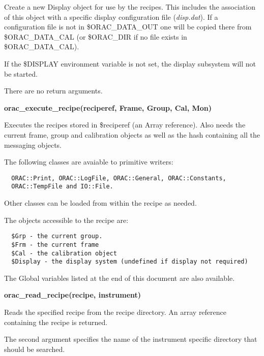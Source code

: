 \begin{description}
\item[\textbf{orac\_setup\_display}] \mbox{}

Create a new Display object for use by the recipes. This includes
the association of this object with a specific display configuration
file (\emph{disp.dat}). If a configuration file is not in \$ORAC\_DATA\_OUT
one will be copied there from \$ORAC\_DATA\_CAL (or \$ORAC\_DIR
if no file exists in \$ORAC\_DATA\_CAL).



If the \$DISPLAY environment variable is not set, the display
subsystem will not be started.



There are no return arguments.

\item \textbf{\textbf{orac\_execute\_recipe}(reciperef, Frame, Group, Cal, Mon)}

Executes the recipes stored in \$reciperef (an Array reference).
Also needs the current frame, group and calibration objects
as well as the hash containing all the messaging objects.



The following classes are avaiable to primitive writers:

\begin{verbatim}
  ORAC::Print, ORAC::LogFile, ORAC::General, ORAC::Constants,
  ORAC::TempFile and IO::File.
\end{verbatim}


Other classes can be loaded from within the recipe as needed.



The objects accessible to the recipe are:

\begin{verbatim}
  $Grp - the current group.
  $Frm - the current frame
  $Cal - the calibration object
  $Display - the display system (undefined if display not required)
\end{verbatim}


The Global variables listed at the end of this document are also
available.

\item \textbf{\textbf{orac\_read\_recipe}(recipe, instrument)}

Reads the specified recipe from the recipe directory.
An array reference containing the recipe is returned.



The second argument specifies the name of the instrument specific
directory that should be searched.




\end{description}
